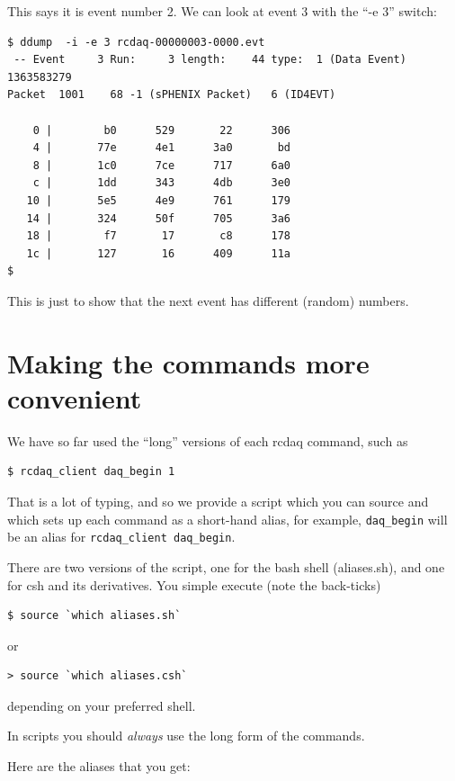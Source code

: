 \documentclass{article}[11pt]
\begin{document}
This says it is event number 2. We can look at event 3 with the ``-e 3'' switch:

\begin{verbatim}
$ ddump  -i -e 3 rcdaq-00000003-0000.evt
 -- Event     3 Run:     3 length:    44 type:  1 (Data Event)  1363583279
Packet  1001    68 -1 (sPHENIX Packet)   6 (ID4EVT)

    0 |        b0      529       22      306 
    4 |       77e      4e1      3a0       bd 
    8 |       1c0      7ce      717      6a0 
    c |       1dd      343      4db      3e0 
   10 |       5e5      4e9      761      179 
   14 |       324      50f      705      3a6 
   18 |        f7       17       c8      178 
   1c |       127       16      409      11a 
$ 
\end{verbatim}

This is just to show that the next event has different (random) numbers. 


\section{Making the commands more convenient}
\label{convenience}

We have so far used the ``long'' versions of each rcdaq command, such as

\begin{verbatim}
$ rcdaq_client daq_begin 1
\end{verbatim}

That is a lot of typing, and so we provide a script which you can source and
which sets up each command as a short-hand alias, for example,
\verb|daq_begin| will be an alias for \verb|rcdaq_client daq_begin|. 

There are two versions of the script, one for the bash shell (aliases.sh), and 
one for csh and its derivatives. You simple execute (note the back-ticks)

\begin{verbatim}
$ source `which aliases.sh`
\end{verbatim}

 or
 
\begin{verbatim}
> source `which aliases.csh`
\end{verbatim}

depending on your preferred shell. 

In scripts you should \emph{always} use the long form of the commands. 

Here are the aliases that you get:
\end{document}
